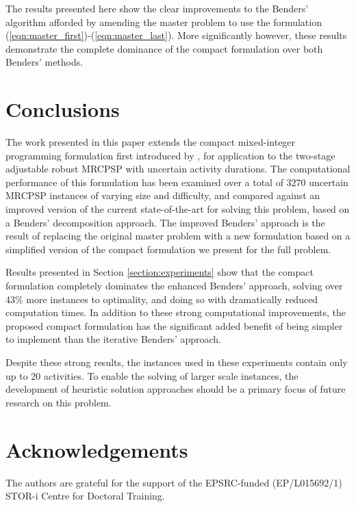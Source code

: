 \documentclass[a4paper,abstracton]{scrartcl}
\begin{document}
The results presented here show the clear improvements to the Benders' algorithm afforded by amending the master problem to use the formulation (\ref{eqn:master_first})-(\ref{eqn:master_last}). More significantly however, these results demonstrate the complete dominance of the compact formulation over both Benders' methods.


\section{Conclusions}

The work presented in this paper extends the compact mixed-integer programming formulation first introduced by \cite{bold2021compact}, for application to the two-stage adjustable robust MRCPSP with uncertain activity durations. The computational performance of this formulation has been examined over a total of 3270 uncertain MRCPSP instances of varying size and difficulty, and compared against an improved version of the current state-of-the-art for solving this problem, based on a Benders' decomposition approach. The improved Benders' approach is the result of replacing the original master problem with a new formulation based on a simplified version of the compact formulation we present for the full problem. 

Results presented in Section \ref{section:experiments} show that the compact formulation completely dominates the enhanced Benders' approach, solving over 43\% more instances to optimality, and doing so with dramatically reduced computation times. In addition to these strong computational improvements, the proposed compact formulation has the significant added benefit of being simpler to implement than the iterative Benders' approach.

Despite these strong results, the instances used in these experiments contain only up to 20 activities. To enable the solving of larger scale instances, the development of heuristic solution approaches should be a primary focus of future research on this problem. 

\section*{Acknowledgements}

The authors are grateful for the support of the EPSRC-funded (EP/L015692/1) STOR-i Centre for Doctoral Training.


\end{document}
